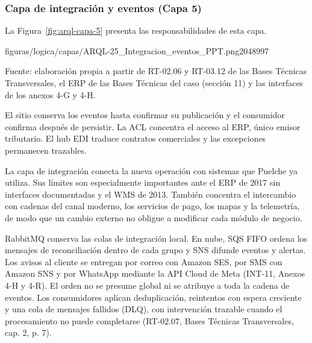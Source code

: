 \begin{landscape}
\subsubsection{Capa de integración y eventos (Capa 5)}
\label{subsec:capa-5-integracion}

La Figura~\ref{fig:arql-capa-5} presenta las responsabilidades de esta capa.

\begin{center}
  \begin{minipage}{\linewidth}\centering
    {figuras/logica/capas/ARQL-25_Integracion_eventos_PPT.png}{2048}{997}{}
  \label{fig:arql-capa-5}
  \par\smallskip
  {\raggedright\fontsize{9pt}{11pt}\selectfont\raggedright Fuente: elaboración propia a partir de RT-02.06 y RT-03.12 de las Bases Técnicas Transversales, el ERP de las Bases Técnicas del caso (sección 11) y las interfaces de los anexos 4-G y 4-H.\par}
  \end{minipage}
\end{center}
\end{landscape}

El sitio conserva los eventos hasta confirmar su publicación y el consumidor confirma después de persistir. La ACL concentra el acceso al ERP, único emisor tributario. El hub EDI traduce contratos comerciales y las excepciones permanecen trazables.


La capa de integración conecta la nueva operación con sistemas que Puelche ya utiliza. Sus límites son especialmente importantes ante el ERP de 2017 sin interfaces documentadas y el WMS de 2013. También concentra el intercambio con cadenas del canal moderno, los servicios de pago, los mapas y la telemetría, de modo que un cambio externo no obligue a modificar cada módulo de negocio.

RabbitMQ conserva las colas de integración local. En nube, SQS FIFO ordena los mensajes de reconciliación dentro de cada grupo y SNS difunde eventos y alertas. Los avisos al cliente se entregan por correo con Amazon SES, por SMS con Amazon SNS y por WhatsApp mediante la API Cloud de Meta (INT-11, Anexos 4-H y 4-R). El orden no se presume global ni se atribuye a toda la cadena de eventos. Los consumidores aplican deduplicación, reintentos con espera creciente y una cola de mensajes fallidos (DLQ), con intervención trazable cuando el procesamiento no puede completarse (RT-02.07, Bases Técnicas Transversales, cap. 2, p. 7).

